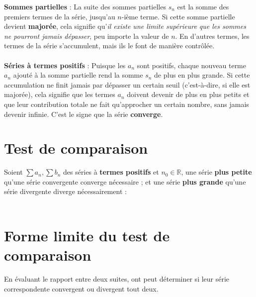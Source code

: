 \documentclass{report}
\begin{document}
\begin{multicols*}{3}
        \textbf{Sommes partielles} : La suite des sommes partielles \(s_n\) est la somme des 
        premiers termes de la série, jusqu'au \(n\)-ième terme. Si cette somme partielle 
        devient \textbf{majorée}, cela signifie qu'\textit{il existe une limite supérieure que les 
        sommes ne pourront jamais dépasser}, peu importe la valeur de \(n\). En d'autres 
        termes, les termes de la série s'accumulent, mais ils le font de manière contrôlée.
        \\\\
        \textbf{Séries à termes positifs} : Puisque les \(a_n\) sont positifs, chaque nouveau 
        terme \(a_n\) ajouté à la somme partielle rend la somme \(s_n\) de plus en plus 
        grande. Si cette accumulation ne finit jamais par dépasser un certain seuil 
        (c'est-à-dire, si elle est majorée), cela signifie que les termes \(a_n\) doivent 
        devenir de plus en plus petits et que leur contribution totale ne fait qu'approcher 
        un certain nombre, sans jamais devenir infinie. C'est le signe que la série 
        \textbf{converge}.


    \vspace{-1em}
    \section{Test de comparaison}
        Soient $\sum a_n, \sum b_n$ des séries à \textbf{termes positifs} 
        et $n_0 \in \mathbb{R}$, une série \textbf{plus petite} qu'une série convergente 
        converge nécessaire ; et une série \textbf{plus grande} qu'une série 
        divergente diverge nécessairement :
    \vspace{1em}\\
     \vspace{1em}\\

     \section{Forme limite du test de comparaison}
        En évaluant le rapport entre deux suites, ont peut déterminer 
        si leur série correspondente 
        convergent ou divergent tout deux. 
        

\end{multicols*}
\end{document}
